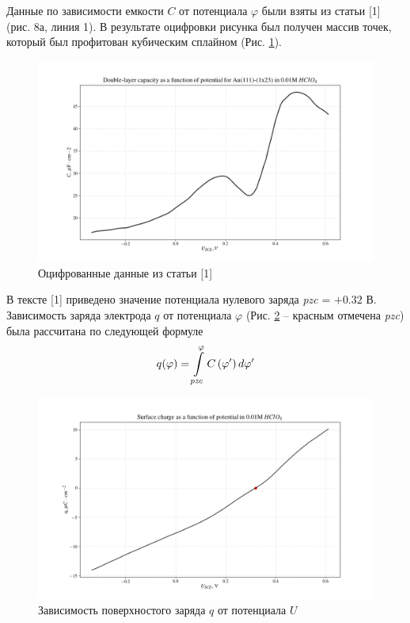 \documentclass[13pt]{extarticle}
\newcommand{\lb}{\left(}
\newcommand{\rb}{\right)}
\begin{document}
Данные по зависимости емкости $C$ от потенциала $\varphi$ были взяты из статьи [1] (рис. 8а, линия 1). В результате оцифровки рисунка был получен массив точек, который был профитован кубическим сплайном (Рис. \ref{kolb1986}).
\begin{figure}[!ht]
	\includegraphics[width = \linewidth]{../pictures/kolb1986_8figure.png}
	\caption{Оцифрованные данные из статьи [1]}
	\label{kolb1986}
\end{figure}

В тексте [1] приведено значение потенциала нулевого заряда \textit{pzc} = $+ 0.32$ В. Зависимость заряда электрода $q$ от потенциала $\varphi$ (Рис. \ref{q_phi} -- красным отмечена \textit{pzc}) была рассчитана по следующей формуле
\begin{gather}
	q(\varphi) = \int\limits_{\textit{pzc}}^{\varphi} C \lb \varphi^\prime \rb d \varphi^\prime \notag
\end{gather}

\begin{figure}[!ht]
	\includegraphics[width = \linewidth]{../pictures/surface_charge.png}
	\caption{Зависимость поверхностого заряда $q$ от потенциала $U$}
	\label{q_phi}
\end{figure}
\end{document}
